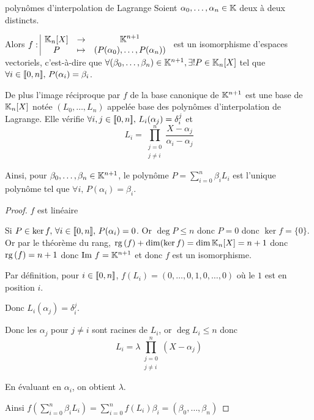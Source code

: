 \begin{proposition}{polynômes d'interpolation de Lagrange}{}
    Soient $\alpha_0, \dots, \alpha_n \in \mathbb{K}$ deux à deux distincts. 
    
    Alors $f: \space \begin{array}{|ccc} \displaystyle \mathbb{K}_n[X] & \to & \displaystyle \mathbb{K}^{n+1} \\ \displaystyle P & \mapsto & \displaystyle \left( P(\alpha_0), \dots, P(\alpha_n) \right) \end{array}$
    est un isomorphisme d'espaces vectoriels, c'est-à-dire que 
    $\forall (\beta_0, \dots, \beta_n) \in \mathbb{K}^{n+1}, \exists ! P \in \mathbb{K}_n[X]$ tel que
    $\forall i \in [\![0, n]\!], \, P(\alpha_i) = \beta_i$.

    De plus l'image réciproque par $f$ de la base canonique de $\mathbb{K}^{n+1}$ est une base de 
    $\mathbb{K}_n[X]$ notée $(L_0, \dots, L_n)$ appelée base des polynômes d'interpolation de Lagrange.
    Elle vérifie $\forall i, j \in [\![0, n]\!], \, L_i(\alpha_j) = \delta_{i}^{j}$ et
    $$L_i = \prod_{\substack{j=0 \\ j \neq i}}^n \frac{X - \alpha_j}{\alpha_i - \alpha_j}$$

    Ainsi, pour $\beta_0, \dots, \beta_n \in \mathbb{K}^{n + 1}$, le polynôme $P = \sum_{i=0}^n \beta_i L_i$ est
    l'unique polynôme tel que $\forall i, \, P(\alpha_i) = \beta_i$.

\end{proposition}

\begin{proof}
    $f$ est linéaire 

    Si $P \in \ker f, \, \forall i \in [\![0, n]\!], \, P(\alpha_i) = 0$.
    Or $\deg P \leqslant n$ donc $P = 0 $ donc $\ker f = \{0\}$. 
    Or par le théorème du rang, $\operatorname{rg} \,(f) + \dim(\ker f) = \dim \mathbb{K}_n[X] = n + 1$ donc
    $\operatorname{rg} \,(f) = n + 1$ donc $\operatorname{Im} \, f = \mathbb{K}^{n + 1}$ et donc $f$ est un isomorphisme.

    \avspace Par définition, pour $i \in [\![0, n]\!]$, $f(L_i) = (0, \dots, 0, 1, 0, \dots, 0)$ où le $1$ est en position $i$.

    Donc $L_i(\alpha_j) = \delta_i^j$.

    Donc les $\alpha_j$ pour $j \neq i$ sont racines de $L_i$, or $\deg L_i \leqslant n$ donc
    $$L_i = \lambda \prod_{\substack{j=0 \\ j \neq i}}^n (X - \alpha_j)$$

    En évaluant en $\alpha_i$, on obtient $\lambda$. 

    Ainsi $\displaystyle f \left( \sum_{i = 0 }^{n } \beta_i L_i \right) = \sum_{i = 0 }^{n } f(L_i) \beta_i = (\beta_0, \dots, \beta_n)$
\end{proof}

